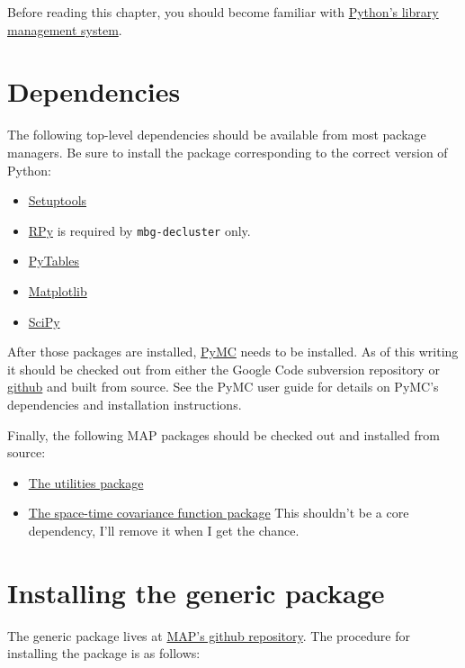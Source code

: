 \bigskip
Before reading this chapter, you should become familiar with \href{http://docs.python.org/install/index.html}{Python's library management system}.

\section{Dependencies}

The following top-level dependencies should be available from most package managers. Be sure to install the package corresponding to the correct version of Python:
\begin{itemize}
    \item \href{http://pypi.python.org/pypi/setuptools}{Setuptools} 
    \item \href{http://rpy.sourceforge.net}{RPy} is required by \texttt{mbg-decluster} only. 
    \item \href{http://www.pytables.org}{PyTables}
    \item \href{http://matplotlib.sourceforge.net}{Matplotlib}  
    \item \href{http://www.scipy.org}{SciPy} 
\end{itemize}

After those packages are installed, \href{http://code.google.com/p/pymc}{PyMC} needs to be installed. As of this writing it should be checked out from either the Google Code subversion repository or \href{http://github.com/pymc-devs/pymc}{github} and built from source. See the PyMC user guide for details on PyMC's dependencies and installation instructions.

Finally, the following MAP packages should be checked out and installed from source:
\begin{itemize}
    \item \href{http://github.com/malaria-atlas-project/map_utils}{The utilities package} 
    \item \href{http://github.com/malaria-atlas-project/st-cov-fun}{The space-time covariance function package} This shouldn't be a core dependency, I'll remove it when I get the chance.
\end{itemize}

\section{Installing the generic package}
The generic package lives at \href{http://github.com/malaria-atlas-project/generic-mbg}{MAP's github repository}. The procedure for installing the package is as follows:

